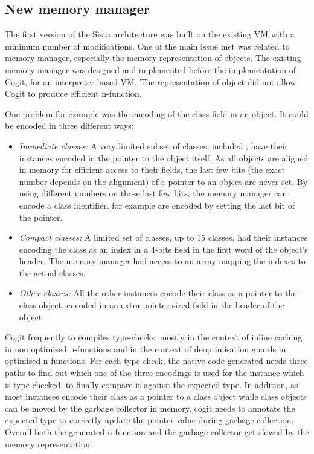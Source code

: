 \documentclass[a4paper,12pt,twoside]{../includes/ThesisStyle}
\begin{document}
\subsection{New memory manager}

The first version of the Sista architecture was built on the existing VM with a minimum number of modifications. One of the main issue met was related to memory manager, especially the memory representation of objects. The existing memory manager was designed and implemented before the implementation of Cogit, for an interpreter-based VM. The representation of object did not allow Cogit to produce efficient n-function.

One problem for example was the encoding of the class field in an object. It could be encoded in three different ways:
\begin{itemize}
	\item \emph{Immediate classes:} A very limited subset of classes, included , have their instances encoded in the pointer to the object itself. As all objects are aligned in memory for efficient access to their fields, the last few bits (the exact number depends on the alignment) of a pointer to an object are never set. By using different numbers on those last few bits, the memory manager can encode a class identifier.  for example are encoded by setting the last bit of the pointer.
	\item \emph{Compact classes:} A limited set of classes, up to 15 classes, had their instances encoding the class as an index in a 4-bits field in the first word of the object's header. The memory manager had access to an array mapping the indexes to the actual classes.
	\item \emph{Other classes:} All the other instances encode their class as a pointer to the class object, encoded in an extra pointer-sized field in the header of the object.
\end{itemize}

Cogit frequently to compiles type-checks, mostly in the context of inline caching in non optimised n-functions and in the context of deoptimisation guards in optimised n-functions. For each type-check, the native code generated needs three paths to find out which one of the three encodings is used for the instance which is type-checked, to finally compare it against the expected type. In addition, as most instances encode their class as a pointer to a class object while class objects can be moved by the garbage collector in memory, cogit needs to annotate the expected type to correctly update the pointer value during garbage collection. Overall both the generated n-function and the garbage collector get slowed by the memory representation.
\end{document}
